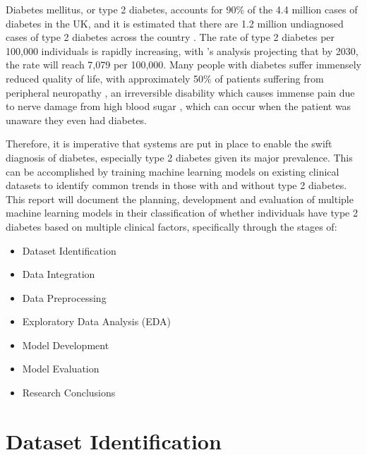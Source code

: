 \documentclass[12pt]{report}
\newcommand{\para}{\vspace{8pt}\noindent}
\begin{document}
Diabetes mellitus, or type 2 diabetes, accounts for 90\% of the 4.4 million cases of diabetes in the UK, and it is estimated that 
there are 1.2 million undiagnosed cases of type 2 diabetes across the country \autocite{diabetes_uk_how_nodate}. The rate of type 
2 diabetes per 100,000 individuals is rapidly increasing, with \textcite{khan_epidemiology_2020}'s analysis projecting that by 
2030, the rate will reach 7,079 per 100,000. Many people with diabetes suffer immensely reduced quality of life, with approximately 50\% 
of patients suffering from peripheral neuropathy \autocite{dhanapalaratnam_effect_2024}, an irreversible disability which causes immense pain due 
to nerve damage from high blood sugar \autocite{nhs_peripheral_2022}, which can occur when the patient was unaware they even 
had diabetes. 

\para
Therefore, it is imperative that systems are put in place to enable the swift diagnosis of diabetes, especially type 2 diabetes 
given its major prevalence. This can be accomplished by training machine learning models on existing clinical datasets 
to identify common trends in those with and without type 2 diabetes. This report will document the planning, development 
and evaluation of multiple machine learning models in their classification of whether individuals have type 2 diabetes based 
on multiple clinical factors, specifically through the stages of:

\begin{itemize}
    \item Dataset Identification
    \item Data Integration
    \item Data Preprocessing
    \item Exploratory Data Analysis (EDA)
    \item Model Development 
    \item Model Evaluation
    \item Research Conclusions
\end{itemize}

\pagebreak 
\section{Dataset Identification}
\end{document}
